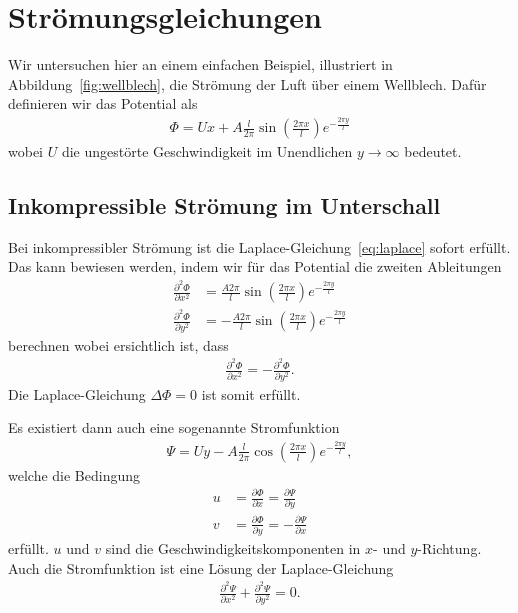 %
%
%
\section{Strömungsgleichungen\label{ueberschall:stroemungsgleichung}}
Wir untersuchen hier an einem einfachen Beispiel, 
illustriert in Abbildung~\ref{fig:wellblech},
die Strömung der Luft über einem Wellblech.
Dafür definieren wir das Potential als
\begin{align*}
    \Phi
    =
    U x + A \frac{l}{2 \pi} \sin\left(\frac{2 \pi x}{l}\right)
    e^{-\frac{2 \pi y}{l}}
\end{align*}
wobei $U$ die ungestörte Geschwindigkeit im 
Unendlichen $y\rightarrow\infty$ bedeutet.


\subsection{Inkompressible Strömung im Unterschall}
Bei inkompressibler Strömung ist die
Laplace-Gleichung~\eqref{eq:laplace} sofort erfüllt.
Das kann bewiesen werden, indem wir für das Potential
die zweiten Ableitungen
\begin{align*}
    \frac{\partial^2 \Phi}{\partial x^2}
    &= \frac{A 2 \pi}{l} \sin\left(\frac{2 \pi x}{l}\right)
    e^{-\frac{2 \pi y}{l}} \\
    \frac{\partial^2 \Phi}{\partial y^2}
    &= -\frac{A 2 \pi}{l} \sin\left(\frac{2 \pi x}{l}\right)
     e^{-\frac{2 \pi y}{l}}
\end{align*}
berechnen wobei ersichtlich ist, dass
\begin{align*}
    \frac{\partial^2 \Phi}{\partial x^2}
    =
    -\frac{\partial^2 \Phi}{\partial y^2}.
\end{align*}
Die Laplace-Gleichung $\Delta \Phi = 0$ ist somit erfüllt.

Es existiert dann auch eine sogenannte Stromfunktion
\begin{align*}
    \Psi
    =
    U y - A \frac{l}{2 \pi} \cos\left(\frac{2 \pi x}{l}\right)
     e^{-\frac{2 \pi y}{l}},
\end{align*}
welche die Bedingung
\begin{align*}
    u 
    &=
    \frac{\partial \Phi}{\partial x}
    =
    \frac{\partial \Psi}{\partial y}
    \\
    v
    &=
    \frac{\partial \Phi}{\partial y}
    =
    -\frac{\partial \Psi}{\partial x}
\end{align*}
erfüllt.
$u$ und $v$ sind die Geschwindigkeitskomponenten in $x$- und $y$-Richtung.
Auch die Stromfunktion ist eine Lösung der Laplace-Gleichung
\begin{align*}
    \frac{\partial^2 \Psi}{\partial x^2}
    +
    \frac{\partial^2 \Psi}{\partial y^2}
    =
    0.
\end{align*}


